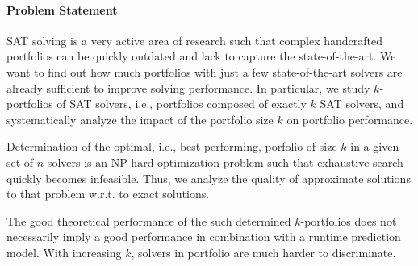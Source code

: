 \documentclass[conference]{IEEEtran}
\begin{document}

\paragraph{Problem Statement}

SAT solving is a very active area of research such that complex handcrafted portfolios can be quickly outdated and lack to capture the state-of-the-art. 
We want to find out how much portfolios with just a few state-of-the-art solvers are already sufficient to improve solving performance. 
In particular, we study $k$-portfolios of SAT solvers, i.e., portfolios composed of exactly $k$ SAT solvers, and systematically analyze the impact of the portfolio size $k$ on portfolio performance. 

Determination of the optimal, i.e., best performing, porfolio of size $k$ in a given set of $n$ solvers is an NP-hard optimization problem such that exhaustive search quickly becomes infeasible. 
Thus, we analyze the quality of approximate solutions to that problem w.r.t. to exact solutions. 

The good theoretical performance of the such determined $k$-portfolios does not necessarily imply a good performance in combination with a runtime prediction model. 
With increasing $k$, solvers in portfolio are much harder to discriminate. 

\end{document}

